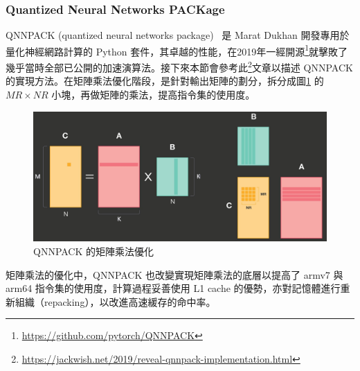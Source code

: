 \subsubsection{Quantized Neural Networks PACKage}
QNNPACK (quantized neural networks package)~\cite{dukhan2018qnnpack,wu2019machine} 是 Marat Dukhan 開發專用於量化神經網路計算的 Python 套件，其卓越的性能，在2019年一經開源\footnote{\url{https://github.com/pytorch/QNNPACK}}就擊敗了幾乎當時全部已公開的加速演算法。接下來本節會參考此\footnote{\url{https://jackwish.net/2019/reveal-qnnpack-implementation.html}}文章以描述 QNNPACK 的實現方法。在矩陣乘法優化階段，是針對輸出矩陣的劃分，拆分成圖\ref{qnnpack1} 的 $MR \times NR$ 小塊，再做矩陣的乘法，提高指令集的使用度。
\begin{figure}[htbp]
    \hfil
    \begin{minipage}[t]{0.8\textwidth}
        \includegraphics[width=\textwidth]{./figures/chapter02_method/qnnpack1.jpg}
        \caption {QNNPACK 的矩陣乘法優化}
        \label{qnnpack1}
    \end{minipage}
    \hfil
\end{figure}
矩陣乘法的優化中，QNNPACK 也改變實現矩陣乘法的底層以提高了 armv7 與 arm64 指令集的使用度，計算過程妥善使用 L1 cache 的優勢，亦對記憶體進行重新組織（repacking），以改進高速緩存的命中率。